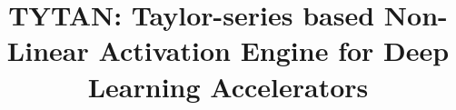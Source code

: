 \documentclass[conference,10pt]{IEEEtran}
\begin{document}
\title{TYTAN: Taylor-series based Non-Linear Activation Engine for Deep Learning Accelerators\vspace{-0.3in}}

\maketitle
\IEEEpeerreviewmaketitle
\end{document}
